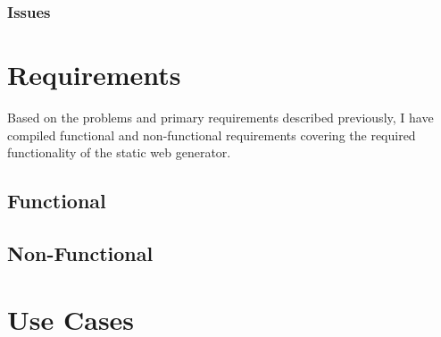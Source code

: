 \subsubsection{Issues}


\section{Requirements}
Based on the problems and primary requirements described previously, I have compiled functional and non-functional requirements covering the required functionality of the static web generator.

\subsection{Functional}


\subsection{Non-Functional}



\section{Use Cases}



